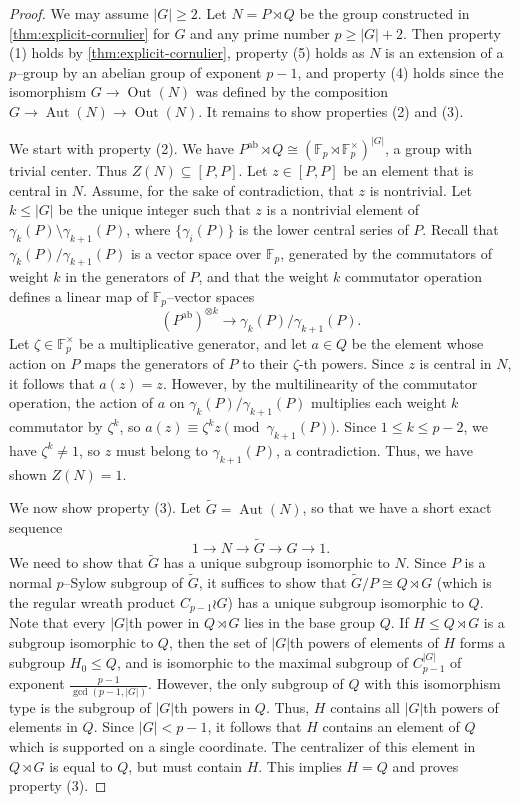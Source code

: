 \documentclass[11pt]{amsart}
\numberwithin{equation}{section}
\begin{document}
\begin{proof}
We may assume $|G| \ge 2$. Let $N = P \rtimes Q$ be the group constructed in \cref{thm:explicit-cornulier} for $G$ and any prime number $p \ge |G| + 2$. Then property (1) holds by \cref{thm:explicit-cornulier}, property (5) holds as $N$ is an extension of a $p$--group by an abelian group of exponent $p - 1$, and property (4) holds since the isomorphism $G \to \operatorname{Out}(N)$ was defined by the composition $G \to \operatorname{Aut}(N) \to \operatorname{Out}(N)$. It remains to show properties (2) and (3).
    
We start with property (2). We have $P^\text{ab} \rtimes Q \cong (\mathbb{F}_p \rtimes \mathbb{F}_p^\times)^{|G|}$, a group with trivial center. Thus $Z(N) \subseteq [P, P]$. Let $z \in [P, P]$ be an element that is central in $N$. Assume, for the sake of contradiction, that $z$ is nontrivial. Let $k \le |G|$ be the unique integer such that $z$ is a nontrivial element of $\gamma_k(P) \setminus \gamma_{k+1}(P)$, where $\{\gamma_i(P)\}$ is the lower central series of $P$. Recall that $\gamma_k(P)/\gamma_{k+1}(P)$ is a vector space over $\mathbb{F}_p$, generated by the commutators of weight $k$ in the generators of $P$, and that the weight $k$ commutator operation defines a linear map of $\mathbb{F}_p$--vector spaces
\[ (P^\text{ab})^{\otimes k} \to \gamma_k(P)/\gamma_{k+1}(P). \]
Let $\zeta \in \mathbb{F}_p^\times$ be a multiplicative generator, and let $a \in Q$ be the element whose action on $P$ maps the generators of $P$ to their $\zeta$-th powers. Since $z$ is central in $N$, it follows that $a(z) = z$. However, by the multilinearity of the commutator operation, the action of $a$ on $\gamma_k(P)/\gamma_{k+1}(P)$ multiplies each weight $k$ commutator by $\zeta^k$, so $a(z) \equiv \zeta^k z \pmod {\gamma_{k+1}(P)}$. Since $1 \le k \le p - 2$, we have $\zeta^k \ne 1$, so $z$ must belong to $\gamma_{k+1}(P)$, a contradiction. Thus, we have shown $Z(N) = 1$.

We now show property (3). Let $\widetilde G = \operatorname{Aut}(N)$, so that we have a short exact sequence
\[1 \to N \to \widetilde G \to G \to 1. \]
We need to show that $\widetilde G$ has a unique subgroup isomorphic to $N$. Since $P$ is a normal $p$--Sylow subgroup of $\widetilde G$, it suffices to show that $\widetilde G/P \cong Q \rtimes G$ (which is the regular wreath product $C_{p-1} \wr G$) has a unique subgroup isomorphic to $Q$. Note that every $|G|$th power in $Q \rtimes G$ lies in the base group $Q$. If $H \le Q \rtimes G$ is a subgroup isomorphic to $Q$, then the set of $|G|$th powers of elements of $H$ forms a subgroup $H_0 \le Q$, and is isomorphic to the maximal subgroup of $C_{p-1}^{|G|}$ of exponent $\frac{p - 1}{\gcd(p - 1, |G|)}$. However, the only subgroup of $Q$ with this isomorphism type is the subgroup of $|G|$th powers in $Q$. Thus, $H$ contains all $|G|$th powers of elements in $Q$. Since $|G| < p - 1$, it follows that $H$ contains an element of $Q$ which is supported on a single coordinate. The centralizer of this element in $Q \rtimes G$ is equal to $Q$, but must contain $H$. This implies $H = Q$ and proves property (3).
\end{proof}
\end{document}
